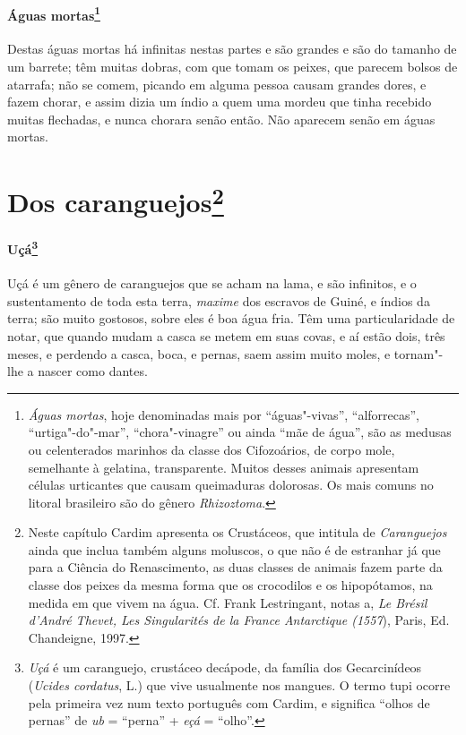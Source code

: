 \paragraph{Águas mortas\footnote{ \textit{Águas mortas}, hoje
denominadas mais por ``águas"-vivas'', ``alforrecas'', ``urtiga"-do"-mar'',
``chora"-vinagre'' ou ainda ``mãe de água'', são as medusas ou celenterados
marinhos da classe dos Cifozoários, de corpo mole, semelhante à
gelatina, transparente. Muitos desses animais apresentam células
urticantes que causam queimaduras dolorosas. Os mais comuns no litoral
brasileiro são do gênero \textit{Rhizoztoma}.}} Destas águas mortas há 
infinitas nestas partes e são grandes e são do tamanho
de um barrete; têm muitas dobras, com que tomam os peixes, que parecem
bolsos de atarrafa; não se comem, picando em alguma pessoa causam
grandes dores, e fazem chorar, e assim dizia um índio a quem uma mordeu
que tinha recebido muitas flechadas, e nunca chorara senão então. Não
aparecem senão em águas mortas. 


\section[Dos caranguejos]{Dos caranguejos\protect\footnote[*]{ \MakeUppercase{N}este capítulo \MakeUppercase{C}ardim apresenta
os \MakeUppercase{C}rustáceos, que intitula de \textit{\MakeUppercase{C}aranguejos} ainda que inclua
também alguns moluscos, o que não é de estranhar já que para a \MakeUppercase{C}iência
do \MakeUppercase{R}enascimento, as duas classes de animais fazem parte da classe dos
peixes da mesma forma que os crocodilos e os hipopótamos, na medida em
que vivem na água. \MakeUppercase{C}f. \MakeUppercase{F}rank \MakeUppercase{L}estringant, notas a, \textit{\MakeUppercase{L}e \MakeUppercase{B}résil
d'\MakeUppercase{A}ndré \MakeUppercase{T}hevet, \MakeUppercase{L}es \MakeUppercase{S}ingularités de la \MakeUppercase{F}rance \MakeUppercase{A}ntarctique (1557}), \MakeUppercase{P}aris, \MakeUppercase{E}d. \MakeUppercase{C}handeigne, 1997.}} 
\paragraph{Uçá\footnote{ \textit{Uçá} é um caranguejo,
crustáceo decápode, da família dos Gecarcinídeos (\textit{Ucides
cordatus}, L.) que vive usualmente nos mangues. O termo tupi ocorre
pela primeira vez num texto português com Cardim, e significa ``olhos
de pernas'' de \textit{ub} = ``perna'' + \textit{eçá} = ``olho''.}} 
Uçá é um gênero de caranguejos que se acham na
lama, e são infinitos, e o sustentamento de toda esta terra, \textit{maxime} dos
escravos de Guiné, e índios da terra; são muito gostosos, sobre eles é
boa água fria. Têm uma particularidade de notar, que quando mudam a
casca se metem em suas covas, e aí estão dois, três meses, e perdendo a
casca, boca, e pernas, saem assim muito moles, e tornam"-lhe a nascer como dantes.

